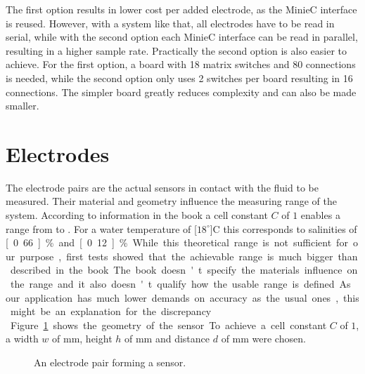 The first option results in lower cost per added electrode, as the MinieC interface is reused. However, with a system like that, all electrodes have to be read in serial, while with the second option each MinieC interface can be read in parallel, resulting in a higher sample rate. Practically the second option is also easier to achieve. For the first option, a board with 18 matrix switches and 80 connections is needed, while the second option only uses 2 switches per board resulting in 16 connections. The simpler board greatly reduces complexity and can also be made smaller.

\section{Electrodes}

The electrode pairs are the actual sensors in contact with the fluid to be measured. Their material and geometry influence the measuring range of the system. According to information in the book \cite{trankler2015sensortechnik} a cell constant $ C $ of $1$ enables a range from  to . For a water temperature of \unit[$18^\circ$]{C} this corresponds to salinities of \unit[0.66]{\%} and \unit[0.12]{\%}. While this theoretical range is not sufficient for our purpose, first tests showed that the achievable range is much bigger than described in the book. The book doesn't specify the materials influence on the range and it also doesn't qualify how the usable range is defined. As our application has much lower demands on accuracy as the usual ones, this might be an explanation for the discrepancy. \\

Figure \ref{fig:sensor} shows the geometry of the sensor. To achieve a cell constant $C$ of $1$, a width $w$ of \unit[1]{mm}, height $h$ of \unit[10]{mm} and distance $d$ of \unit[10]{mm} were chosen.\\

\begin{figure}[H]
	\begin{center}
		\caption{An electrode pair forming a sensor.}
		\label{fig:sensor}
	\end{center}
\end{figure}

